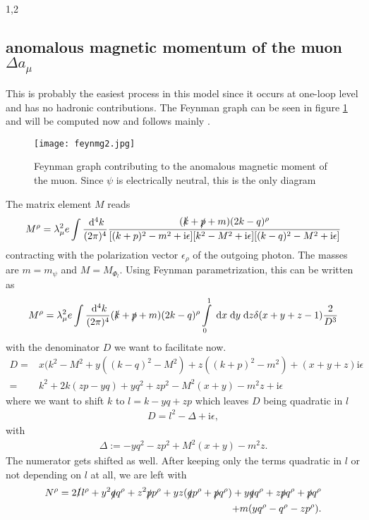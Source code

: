 \documentclass[11pt,a4paper,twoside]{article}
\begin{document}
\begin{spacing}{1,2}
\subsection{anomalous magnetic momentum of the muon $\Delta a_\mu$}
This is probably the easiest process in this model since it occurs at one-loop level and has no hadronic contributions. The Feynman graph can be seen
in figure \ref{pic_feyn} and will be computed now and follows mainly \cite{Peskin}.
\begin{figure}
 \texttt{[image: feynmg2.jpg]}
 \centering
 \caption{Feynman graph contributing to the anomalous magnetic moment of the muon. Since $\psi$ is electrically neutral, this is the only diagram}
 \label{pic_feyn}
\end{figure}
The matrix element $M$ reads
\begin{align}
 M^\rho = \lambda_\mu^2 e \int \frac{\; \mathrm{d}^4 k}{(2\pi)^4} \frac{(\slashed{k}+\slashed{p} + m)(2k-q)^\rho}{[(k+p)^2-m^2+\text{i}\epsilon][k^2-M^2+\text{i}\epsilon][(k-q)^2-M^2+\text{i}\epsilon]}
\end{align}
contracting with the polarization vector $\epsilon_\rho$ of the outgoing photon. The masses are $m=m_\psi$ and $M = M_{\Phi_l}$. Using Feynman 
parametrization, this can be written as
\begin{align}
 M^\rho = \lambda_\mu^2 e \int \frac{\; \mathrm{d}^4 k}{(2\pi)^4} (\slashed{k}+\slashed{p} + m)(2k-q)^\rho \int\limits_0^1 \; \mathrm{d} x \; \mathrm{d} y \; \mathrm{d} z \delta(x+y+z-1) \frac{2}{D^3}
\end{align}
with the denominator $D$ we want to facilitate now.
\begin{align}
 D =& x(k^2-M^2 + y((k-q)^2-M^2) + z((k+p)^2-m^2) + (x+y+z)\text{i}\epsilon\\
 =& k^2 + 2k(zp-yq) + yq^2 + zp^2 - M^2(x+y) - m^2z + \text{i}\epsilon
\end{align}
where we want to shift $k$ to $l=k-yq+zp$ which leaves $D$ being quadratic in $l$
\begin{align}
 D = l^2 - \Delta + \text{i}\epsilon,
\end{align}
with 
\begin{align}
 \Delta := -yq^2 -zp^2 + M^2(x+y)-m^2z.
\end{align}
The numerator gets shifted as well. After keeping only the terms quadratic in $l$ or not depending on $l$ at all, we are left with
\begin{align}
 N^\rho = 2\slashed{l} l^\rho + y^2\slashed{q}q^\rho + z^2\slashed{p}p^\rho + yz(\slashed{q}p^\rho+\slashed{p}q^\rho) + y\slashed{q}q^\rho + z\slashed{p}q^\rho + \slashed{p}q^\rho \\ + m(yq^\rho-q^\rho-zp^\rho)    .

\end{align}
\end{spacing}
\end{document}
